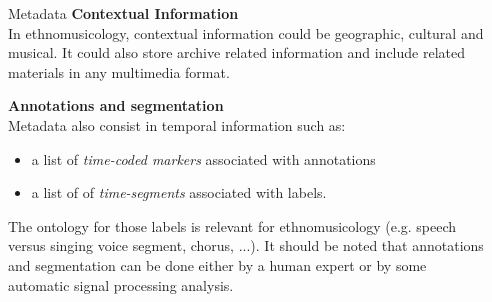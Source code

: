 \documentclass[final, hyperref, table]{beamer}
\begin{document}
\begin{frame}[containsverbatim]{}
\begin{columns}[t]
\begin{column}[T]{.49\linewidth}
\begin{block}{Metadata}
\textbf{Contextual Information}\\
In ethnomusicology, contextual information could be geographic, cultural and musical. It could also store archive related information and include related materials in any multimedia format. 

\textbf{Annotations and segmentation}\\
Metadata also consist in temporal information such as:
\begin{itemize}
\item a list of \emph{time-coded markers} associated with annotations
\item a list of of \emph{time-segments} associated with labels.
\end{itemize}
The ontology for those labels is relevant for ethnomusicology (e.g. speech versus singing voice segment, chorus, ...).
It should be noted that annotations and segmentation can be done either by a human expert or by some automatic signal processing analysis.

\end{block}
    \end{column}
   
\begin{column}[T]{.49\linewidth}
\end{column}
\end{columns}
\end{frame}
\end{document}
